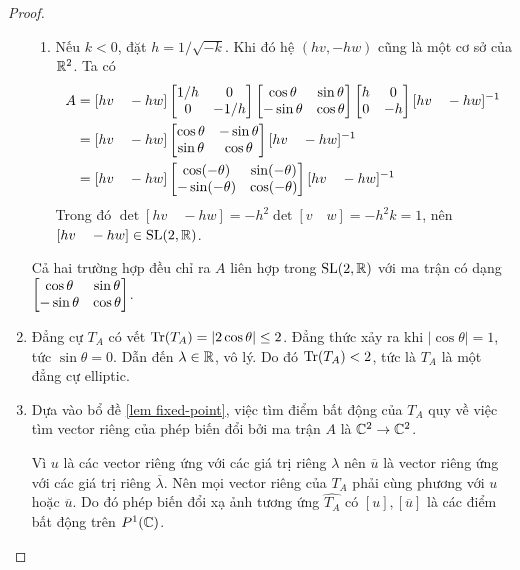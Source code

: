 \begin{proof}
\begin{enumerate}
\begin{enumerate}
    \item Nếu $k<0$, đặt $h =1/\sqrt{-k}$. Khi đó hệ $(hv,-hw)$ cũng là một cơ sở của $\mathbb{R}^2$. Ta có
        \begin{align*}
            A &= [hv \quad -hw] \begin{bmatrix}
        1/h & 0\\
        0 & -1/h
        \end{bmatrix}
        \begin{bmatrix} \cos{\theta} & \sin{\theta}\\ -\sin{\theta} & \cos{\theta} \end{bmatrix}\begin{bmatrix}
        h & 0\\
        0 & -h
        \end{bmatrix}[hv \quad -hw]^{-1}\\
        &= [hv \quad -hw]\begin{bmatrix}
            \cos\theta & -\sin\theta\\
            \sin\theta & \cos\theta
        \end{bmatrix}[hv \quad -hw]^{-1}\\
        &= [hv \quad -hw]\begin{bmatrix}
            \cos(-\theta) & \sin(-\theta)\\
            -\sin(-\theta) & \cos(-\theta)
        \end{bmatrix}[hv \quad -hw]^{-1}\\
    \end{align*}
    Trong đó $\det[hv \quad -hw] = -h^2\det[v\quad w]= -h^2k = 1$, nên $[hv\quad -hw]\in \operatorname{SL}(2,\mathbb{R})$. 
    \end{enumerate}
    Cả hai trường hợp đều chỉ ra $A$ liên hợp trong $\operatorname{SL}(2,\mathbb{R})$ với ma trận có dạng $\begin{bmatrix} \cos{\theta} & \sin{\theta}\\ -\sin{\theta} & \cos{\theta} \end{bmatrix}$.
        \item Đẳng cự $T_A$ có vết $\operatorname{Tr}(T_A) = |2\cos\theta|\leq 2$. Đẳng thức xảy ra khi $|\cos\theta| = 1$, tức $\sin\theta = 0$. Dẫn đến $\lambda  \in \mathbb{R}$, vô lý. Do đó $\operatorname{Tr}(T_A) < 2$, tức là $T_A$ là một đẳng cự elliptic.
        
        \item Dựa vào bổ đề \ref{lem fixed-point}, việc tìm điểm bất động của $T_A$ quy về việc tìm vector riêng của phép biến đổi bởi ma trận $A$ là $\mathbb{C}^2\to \mathbb{C}^2$.

        Vì $u$ là các vector riêng ứng với các giá trị riêng $\lambda$ nên $\overline{u}$ là vector riêng ứng với các giá trị riêng $\overline{\lambda}$. Nên mọi vector riêng của $T_A$ phải cùng phương với $u$ hoặc $\overline{u}$. Do đó phép biến đổi xạ ảnh tương ứng $\widehat{T_A}$ có $[u],[\overline{u}]$ là các điểm bất động trên $P^1(\mathbb{C})$.
        

\end{enumerate}
\end{proof}
